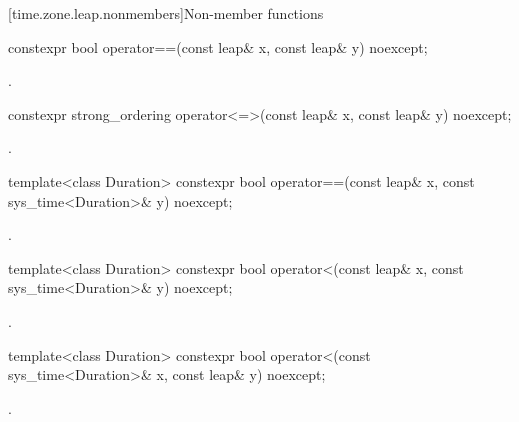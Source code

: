 [time.zone.leap.nonmembers]{Non-member functions}

%
\begin{itemdecl}
constexpr bool operator==(const leap& x, const leap& y) noexcept;
\end{itemdecl}

\begin{itemdescr}
\pnum
\returns
{}.
\end{itemdescr}

%
\begin{itemdecl}
constexpr strong_ordering operator<=>(const leap& x, const leap& y) noexcept;
\end{itemdecl}

\begin{itemdescr}
\pnum
\returns
{}.
\end{itemdescr}

%
%
\begin{itemdecl}
template<class Duration>
  constexpr bool operator==(const leap& x, const sys_time<Duration>& y) noexcept;
\end{itemdecl}

\begin{itemdescr}
\pnum
\returns
{}.
\end{itemdescr}

%
%
\begin{itemdecl}
template<class Duration>
  constexpr bool operator<(const leap& x, const sys_time<Duration>& y) noexcept;
\end{itemdecl}

\begin{itemdescr}
\pnum
\returns
{}.
\end{itemdescr}

%
%
\begin{itemdecl}
template<class Duration>
  constexpr bool operator<(const sys_time<Duration>& x, const leap& y) noexcept;
\end{itemdecl}

\begin{itemdescr}
\pnum
\returns
{}.
\end{itemdescr}

